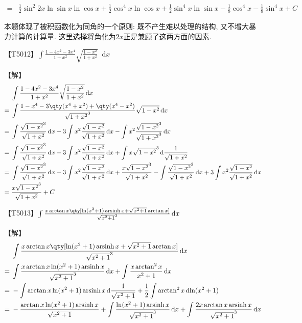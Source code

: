 \documentclass{ctexbook}
\DeclareMathOperator{\arsinh}{arsinh}
\newcommand*{\dif}{\mathop{}\!\mathrm{d}}
\begin{document}
{\begin{align*}
={}&\frac{1}{2}\sin^{2}{2x}\ln{\sin{x}}\ln{\cos{x}}+\frac{1}{2}\cos^{4}{x}\ln{\cos{x}}+\frac{1}{2}\sin^{4}{x}\ln{\sin{x}}-\frac{1}{8}\cos^{4}{x}-\frac{1}{8}\sin^{4}{x}+C
\end{align*}\par
{\kaishu 本题体现了被积函数化为同角的一个原则: 既不产生难以处理的结构, 又不增大暴力计算的计算量. 这里选择将角化为$2x$正是兼顾了这两方面的因素. \par}
【T5012】$\int\frac{1-4x^{2}-3x^{4}}{1+x^{2}}\sqrt{\frac{1-x^{2}}{1+x^{2}}}\dif{x}$\par
【解】
\begin{align*}
{}&\int\frac{1-4x^{2}-3x^{4}}{1+x^{2}}\sqrt{\frac{1-x^{2}}{1+x^{2}}}\dif{x}\\
={}&\int\frac{1-x^{4}-3\qty(x^{4}+x^{2})+\qty(x^{4}-x^{2})}{\sqrt{1+x^{2}}^{3}}\sqrt{1-x^{2}}\dif{x}\\
={}&\int\frac{\sqrt{1-x^{2}}^{3}}{\sqrt{1+x^{2}}}\dif{x}-3\int x^{2}\frac{\sqrt{1-x^{2}}}{\sqrt{1+x^{2}}}\dif{x}-\int x^{2}\frac{\sqrt{1-x^{2}}^{3}}{\sqrt{1+x^{2}}^{3}}\dif{x}\\
={}&\int\frac{\sqrt{1-x^{2}}^{3}}{\sqrt{1+x^{2}}}\dif{x}-3\int x^{2}\frac{\sqrt{1-x^{2}}}{\sqrt{1+x^{2}}}\dif{x}+\int x\sqrt{1-x^{2}}^{3}\dif{\frac{1}{\sqrt{1+x^{2}}}}\\
={}&\int\frac{\sqrt{1-x^{2}}^{3}}{\sqrt{1+x^{2}}}\dif{x}-3\int x^{2}\frac{\sqrt{1-x^{2}}}{\sqrt{1+x^{2}}}\dif{x}+\frac{x\sqrt{1-x^{2}}^{3}}{\sqrt{1+x^{2}}}-\int\frac{\sqrt{1-x^{2}}^{3}}{\sqrt{1+x^{2}}}\dif{x}+3\int x^{2}\frac{\sqrt{1-x^{2}}}{\sqrt{1+x^{2}}}\dif{x}\\
={}&\frac{x\sqrt{1-x^{2}}^{3}}{\sqrt{1+x^{2}}}+C
\end{align*}\par
【T5013】$\int\frac{x\arctan{x}\qty[\ln(x^{2}+1)\arsinh{x}+\sqrt{x^{2}+1}\arctan{x}]}{\sqrt{x^{2}+1}^{3}}\dif{x}$\par
【解】
\begin{align*}
{}&\int\frac{x\arctan{x}\qty[\ln(x^{2}+1)\arsinh{x}+\sqrt{x^{2}+1}\arctan{x}]}{\sqrt{x^{2}+1}^{3}}\dif{x}\\
={}&\int\frac{x\arctan{x}\ln(x^{2}+1)\arsinh{x}}{\sqrt{x^{2}+1}^{3}}\dif{x}+\int\frac{x\arctan^{2}{x}}{x^{2}+1}\dif{x}\\
={}&-\int\arctan{x}\ln(x^{2}+1)\arsinh{x}\dif{\frac{1}{\sqrt{x^{2}+1}}}+\frac{1}{2}\int\arctan^{2}{x}\dif{\ln(x^{2}+1)}\\
={}&-\frac{\arctan{x}\ln(x^{2}+1)\arsinh{x}}{\sqrt{x^{2}+1}}+\int\frac{\ln(x^{2}+1)\arsinh{x}}{\sqrt{x^{2}+1}^{3}}\dif{x}+\int\frac{2x\arctan{x}\arsinh{x}}{\sqrt{x^{2}+1}^{3}}\dif{x}\\

\end{align*}}
\end{document}
